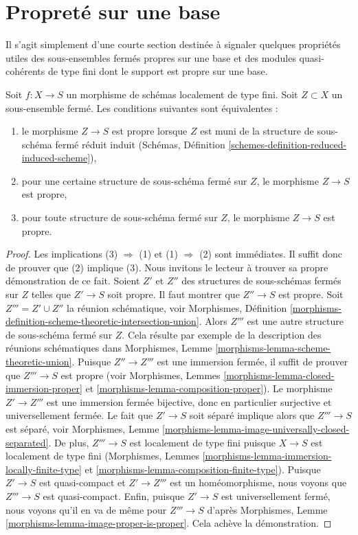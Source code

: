 \section{Propreté sur une base}
\label{section-proper-over-base}

\noindent
Il s'agit simplement d'une courte section destinée à signaler quelques propriétés utiles
des sous-ensembles fermés propres sur une base et des modules quasi-cohérents
de type fini dont le support est propre sur une base.

\begin{lemma}
\label{lemma-closed-proper-over-base}
Soit $f : X \to S$ un morphisme de schémas localement de type fini.
Soit $Z \subset X$ un sous-ensemble fermé. Les conditions suivantes sont équivalentes :
\begin{enumerate}
\item le morphisme $Z \to S$ est propre lorsque $Z$ est muni de la structure
de sous-schéma fermé réduit induit
(Schémas, Définition \ref{schemes-definition-reduced-induced-scheme}),
\item pour une certaine structure de sous-schéma fermé sur $Z$, le morphisme $Z \to S$
est propre,
\item pour toute structure de sous-schéma fermé sur $Z$, le morphisme
$Z \to S$ est propre.
\end{enumerate}
\end{lemma}

\begin{proof}
Les implications (3) $\Rightarrow$ (1) et (1) $\Rightarrow$ (2)
sont immédiates. Il suffit donc de prouver que (2) implique (3).
Nous invitons le lecteur à trouver sa propre démonstration de ce fait.
Soient $Z'$ et $Z''$ des structures de sous-schémas fermés sur $Z$
telles que $Z' \to S$ soit propre. Il faut montrer que $Z'' \to S$ est propre.
Soit $Z''' = Z' \cup Z''$ la réunion schématique, voir
Morphismes, Définition
\ref{morphisms-definition-scheme-theoretic-intersection-union}.
Alors $Z'''$ est une autre structure de sous-schéma fermé sur $Z$.
Cela résulte par exemple de la description des réunions schématiques dans
Morphismes, Lemme \ref{morphisms-lemma-scheme-theoretic-union}.
Puisque $Z'' \to Z'''$ est une immersion fermée, il suffit de prouver
que $Z''' \to S$ est propre (voir
Morphismes, Lemmes \ref{morphisms-lemma-closed-immersion-proper} et
\ref{morphisms-lemma-composition-proper}).
Le morphisme $Z' \to Z'''$ est une immersion fermée bijective,
donc en particulier surjective et universellement fermée.
Le fait que $Z' \to S$ soit séparé implique alors que
$Z''' \to S$ est séparé, voir
Morphismes, Lemme \ref{morphisms-lemma-image-universally-closed-separated}.
De plus, $Z''' \to S$ est localement de type fini
puisque $X \to S$ est localement de type fini
(Morphismes, Lemmes \ref{morphisms-lemma-immersion-locally-finite-type} et
\ref{morphisms-lemma-composition-finite-type}).
Puisque $Z' \to S$ est quasi-compact et $Z' \to Z'''$ est un homéomorphisme,
nous voyons que $Z''' \to S$ est quasi-compact.
Enfin, puisque $Z' \to S$ est universellement fermé, nous voyons qu'il
en va de même pour $Z''' \to S$ d'après
Morphismes, Lemme \ref{morphisms-lemma-image-proper-is-proper}.
Cela achève la démonstration.
\end{proof}

